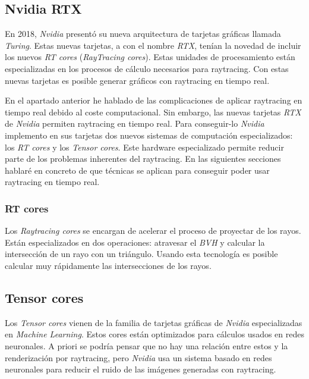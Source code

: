 \begin{pregunta}
\subsection*{Nvidia RTX}

En 2018, \emph{Nvidia} presentó su nueva arquitectura de tarjetas gráficas llamada \emph{Turing}.
Estas nuevas tarjetas, a con el nombre \emph{RTX}, tenían la novedad de incluir
los nuevos \emph{RT cores} (\emph{RayTracing cores}). Estas unidades de
procesamiento están especializadas en los procesos de cálculo necesarios para
raytracing. Con estas nuevas tarjetas es posible generar gráficos con raytracing
en tiempo real. \cite{noauthor_introducing_2018}

En el apartado anterior he hablado de las complicaciones de aplicar raytracing
en tiempo real debido al coste computacional. Sin embargo, las nuevas tarjetas
\emph{RTX} de \emph{Nvidia} permiten raytracing en tiempo real. Para
conseguir-lo \emph{Nvidia} implemento en sus tarjetas dos nuevos sistemas de
computación especializados: los \emph{RT cores} y los \emph{Tensor cores}. Este
hardware especializado permite reducir parte de los problemas inherentes del
raytracing. En las siguientes secciones hablaré en concreto de que técnicas se
aplican para conseguir poder usar raytracing en tiempo real.

\subsubsection*{RT cores}

Los \emph{Raytracing cores} se encargan de acelerar el proceso de proyectar de los
rayos. Están especializados en dos operaciones: atravesar el \emph{BVH} y
calcular la intersección de un rayo con un triángulo. Usando esta tecnología es
posible calcular muy rápidamente las intersecciones de los rayos.

\subsection*{Tensor cores}

Los \emph{Tensor cores} vienen de la familia de tarjetas gráficas de
\emph{Nvidia} especializadas en \emph{Machine Learning}. Estos cores están
optimizados para cálculos usados en redes neuronales. A priori se podría pensar
que no hay una relación entre estos y la renderización por raytracing, pero
\emph{Nvidia} usa un sistema basado en redes neuronales para reducir el ruido de
las imágenes generadas con raytracing.


\end{pregunta}
